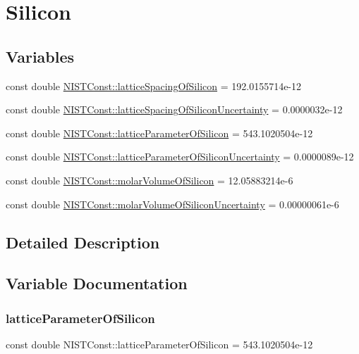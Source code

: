 \hypertarget{group___silicon}{}\section{Silicon}
\label{group___silicon}
\subsection*{Variables}
\begin{DoxyCompactItemize}
\item 
const double \hyperlink{group___silicon_ga439c53134da8a910d17c996b136da7a8}{N\+I\+S\+T\+Const\+::lattice\+Spacing\+Of\+Silicon} = 192.\+0155714e-\/12
\item 
const double \hyperlink{group___silicon_ga0f426756bd67207acf22b7ebc224abec}{N\+I\+S\+T\+Const\+::lattice\+Spacing\+Of\+Silicon\+Uncertainty} = 0.\+0000032e-\/12
\item 
const double \hyperlink{group___silicon_ga8ab64e0d4d7e0ebde43f1dd5f4ff68bf}{N\+I\+S\+T\+Const\+::lattice\+Parameter\+Of\+Silicon} = 543.\+1020504e-\/12
\item 
const double \hyperlink{group___silicon_ga4ced8c2e5ea89443bad8360b0a822660}{N\+I\+S\+T\+Const\+::lattice\+Parameter\+Of\+Silicon\+Uncertainty} = 0.\+0000089e-\/12
\item 
const double \hyperlink{group___silicon_gaf084f6d4668f778d204cd782269f082c}{N\+I\+S\+T\+Const\+::molar\+Volume\+Of\+Silicon} = 12.\+05883214e-\/6
\item 
const double \hyperlink{group___silicon_ga35b10008977416da18242a7e7808fc0d}{N\+I\+S\+T\+Const\+::molar\+Volume\+Of\+Silicon\+Uncertainty} = 0.\+00000061e-\/6
\end{DoxyCompactItemize}


\subsection{Detailed Description}


\subsection{Variable Documentation}
\mbox{\label{group___silicon_ga8ab64e0d4d7e0ebde43f1dd5f4ff68bf}} 
\subsubsection{\texorpdfstring{lattice\+Parameter\+Of\+Silicon}{latticeParameterOfSilicon}}
{\footnotesize\ttfamily const double N\+I\+S\+T\+Const\+::lattice\+Parameter\+Of\+Silicon = 543.\+1020504e-\/12}

